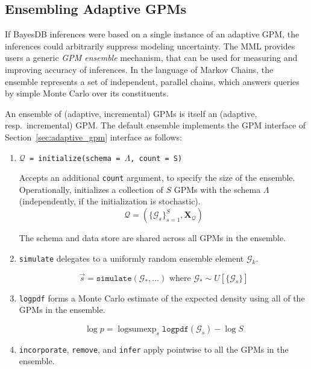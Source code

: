\documentclass[10pt,letterpaper]{article}
\DeclareMathOperator{\logsumexp}{logsumexp}
\newcommand{\set}[1]{\{#1\}}
\newcommand{\G}{\mathcal{G}}
\begin{document}
\subsection{Ensembling Adaptive GPMs}
\label{sec:ensemble}

If BayesDB inferences were based on a single instance of an adaptive
GPM, the inferences could arbitrarily suppress modeling
uncertainty. The MML provides users a generic \emph{GPM ensemble}
mechanism, that can be used for measuring and improving accuracy of
inferences.  In the language of Markov Chains, the ensemble represents
a set of independent, parallel chains, which answers queries by simple
Monte Carlo over its constituents.

An ensemble of (adaptive, incremental) GPMs is itself an (adaptive,
resp.\ incremental) GPM.  The default ensemble implements the GPM interface of
Section~\ref{sec:adaptive_gpm}
interface as follows:

\begin{enumerate}
\item \texttt{$\mathcal{Q}$ = initialize(schema = $\Lambda$, count = S)}

    Accepts an additional \texttt{count} argument, to specify the size
    of the ensemble.  Operationally, initializes a collection of $S$
    GPMs with the schema $\Lambda$ (independently, if the
    initialization is stochastic).
    $$
    \mathcal{Q} = (\set{\G_s}_{s=1}^S, \mathbf{X_\mathcal{Q}})
    $$

    The schema and data store are shared across all GPMs in the
    ensemble.

\item \texttt{simulate} delegates to a uniformly random ensemble
  element $\G_k$.

    $$
    \vec{s} = \texttt{simulate} (\G_*,\dots) \text{ where }
    \G_* \sim U[\set{\G_s}]
    $$


\item \texttt{logpdf} forms a Monte Carlo estimate of the expected density using
all of the GPMs in the ensemble.

    $$
    \log p = \logsumexp_s\texttt{logpdf}(\G_s) - \log S
    $$

\item \texttt{incorporate}, \texttt{remove}, and \texttt{infer} apply
  pointwise to all the GPMs in the ensemble.

\end{enumerate}
\end{document}
